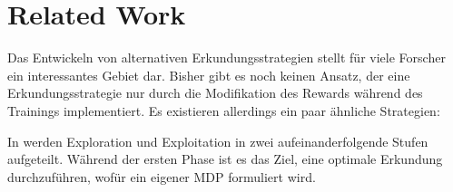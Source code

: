 \chapter{Related Work}

Das Entwickeln von alternativen Erkundungsstrategien stellt für viele Forscher ein interessantes Gebiet dar. Bisher gibt es noch keinen Ansatz, der eine Erkundungsstrategie nur durch die Modifikation des Rewards während des Trainings implementiert. Es existieren allerdings ein paar ähnliche Strategien:

In \cite{r09_csimcsek2006intrinsic} werden Exploration und Exploitation in zwei aufeinanderfolgende Stufen aufgeteilt. Während der ersten Phase ist es das Ziel, eine optimale Erkundung durchzuführen, wofür ein eigener MDP formuliert wird. 


